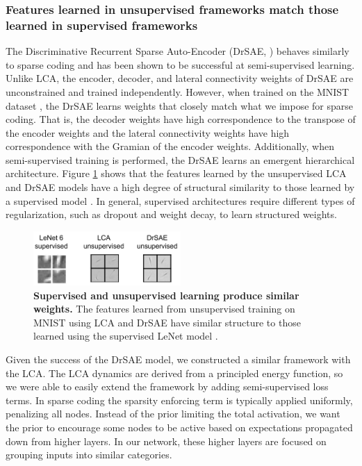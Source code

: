 \subsubsection{Features learned in unsupervised frameworks match those learned in supervised frameworks}
The Discriminative Recurrent Sparse Auto-Encoder (DrSAE, \cite{rolfe2013discriminative}) behaves similarly to sparse coding and has been shown to be successful at semi-supervised learning.
Unlike LCA, the encoder, decoder, and lateral connectivity weights of DrSAE are unconstrained and trained independently.
However, when trained on the MNIST dataset \parencite{lecun1998mnist}, the DrSAE learns weights that closely match what we impose for sparse coding.
That is, the decoder weights have high correspondence to the transpose of the encoder weights and the lateral connectivity weights have high correspondence with the Gramian of the encoder weights.
Additionally, when semi-supervised training is performed, the DrSAE learns an emergent hierarchical architecture.
Figure \ref{fig:ch3_lenet_lca_drsae_weights} shows that the features learned by the unsupervised LCA and DrSAE models have a high degree of structural similarity to those learned by a supervised model \parencite{lecun1998gradient}.
In general, supervised architectures require different types of regularization, such as dropout and weight decay, to learn structured weights. %

\begin{figure}
    \centering
    \includegraphics[width=0.5\textwidth]{figures/lenet_lca_drsae_weights.png}
    \caption{\textbf{Supervised and unsupervised learning produce similar weights.} The features learned from unsupervised training on MNIST using LCA \parencite{rozell2008sparse} and DrSAE \parencite{rolfe2013discriminative} have similar structure to those learned using the supervised LeNet model \parencite{lecun1998gradient}.}
    \label{fig:ch3_lenet_lca_drsae_weights}
\end{figure}

Given the success of the DrSAE model, we constructed a similar framework with the LCA. The LCA dynamics are derived from a principled energy function, so we were able to easily extend the framework by adding semi-supervised loss terms. In sparse coding the sparsity enforcing term is typically applied uniformly, penalizing all nodes. Instead of the prior limiting the total activation, we want the prior to encourage some nodes to be active based on expectations propagated down from higher layers. In our network, these higher layers are focused on grouping inputs into similar categories.

